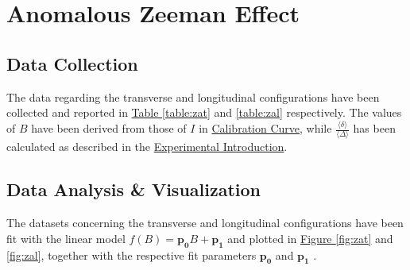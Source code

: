 \documentclass[a4paper,12pt,abstracton]{scrartcl}
\begin{document}
\begin{table}[H]
\caption{}
\centering
{}
\label{table:ZnT}
\end{table}

\clearpage

\section{Anomalous Zeeman Effect}\label{sec: AZ}

\subsection{Data Collection}

The data regarding the transverse and longitudinal configurations have been collected and reported in \hyperref[table:zat]{Table \ref*{table:zat}} and \hyperref[table:zal]{ \ref*{table:zal}} respectively. The values of $B$ have been derived from those of $I$ in \hyperref[sec:cal]{Calibration Curve}, while $\frac{\langle \delta \rangle}{\langle \Delta \rangle}$ has been calculated as described in the \hyperref[sec: ExpIntro]{Experimental Introduction}.

\subsection{Data Analysis \& Visualization}

The datasets concerning the transverse and longitudinal configurations have been fit with the linear model $f(B)=\boldsymbol{p_0}B+\boldsymbol{p_1}$ and plotted in \hyperref[fig:zat]{Figure \ref*{fig:zat}} and \hyperref[fig:zal]{ \ref*{fig:zal}}, together with the respective fit parameters $\boldsymbol{p_0}$ and  $\boldsymbol{p_1}$ .
\end{document}
